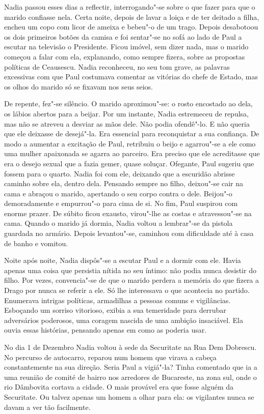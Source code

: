 Nadia passou esses dias a reflectir, interrogando"-se sobre o que fazer
para que o marido confiasse nela. Certa noite, depois de lavar a loiça e
de ter deitado a filha, encheu um copo com licor de ameixa e bebeu"-o de
um trago. Depois desabotoou os dois primeiros botões da camisa e foi
sentar"-se no sofá ao lado de Paul a escutar na
televisão o Presidente. Ficou imóvel, sem dizer nada, mas o marido
começou a falar com ela, explanando, como sempre fizera, sobre as
propostas políticas de Ceausescu. Nadia reconheceu, no seu tom grave, as
palavras excessivas com que Paul costumava comentar as vitórias do
chefe de Estado, mas os olhos do marido só se fixavam nos seus seios.

De repente, fez"-se silêncio. O marido aproximou"-se: o rosto encostado ao
dela, os lábios abertos para a beijar. Por um instante, Nadia estremeceu
de repulsa, mas não se atreveu a desviar as mãos dele. Não podia
ofendê"-lo. E não queria que ele deixasse de desejá"-la. Era essencial
para reconquistar a sua confiança. De modo a aumentar a excitação de
Paul, retribuiu o beijo e agarrou"-se a ele como uma mulher apaixonada se
agarra ao parceiro. Era preciso que ele acreditasse que era o desejo
sexual que a fazia gemer, quase soluçar. Ofegante, Paul sugeriu que
fossem para o quarto. Nadia foi com ele, deixando que a escuridão
abrisse caminho sobre ela, dentro dela. Pensando sempre no filho,
deixou"-se cair na cama e abraçou o marido, apertando o seu corpo contra
o dele. Beijou"-o demoradamente e empurrou"-o para cima de si. No fim,
Paul suspirou com enorme prazer. De súbito ficou exausto, virou"-lhe as
costas e atravessou"-se na cama. Quando o marido já dormia, Nadia voltou
a lembrar"-se da pistola guardada no armário. Depois levantou"-se,
caminhou com dificuldade até à casa de banho e vomitou.

Noite após noite, Nadia dispôs"-se a escutar Paul e a
dormir com ele. Havia apenas uma coisa que persistia nítida no seu
íntimo: não podia nunca desistir do filho. Por
vezes, convencia"-se de que o marido perdera a memória do que fizera a
Drago por nunca se referir a ele. Só lhe interessava o que acontecia
no partido. Enumerava intrigas políticas, armadilhas a pessoas comuns e
vigilâncias. Esboçando um sorriso vitorioso, exibia a sua temeridade
para derrubar adversários poderosos, uma coragem nascida de uma ambição
insaciável. Ela ouvia essas histórias, pensando apenas em como as
poderia usar.

\bigskip

No dia 1 de Dezembro Nadia voltou à sede da Securitate na Rua Dem
Dobrescu. No percurso de autocarro, reparou num homem que virava a
cabeça constantemente na sua direção. Seria Paul a vigiá"-la? Tinha
comentado que ia a uma reunião de comité de bairro nos arredores de
Bucareste, na zona sul, onde o rio Dâmbovita cortava a cidade. O mais
provável era que fosse alguém da Securitate. Ou talvez apenas um homem
a olhar para ela: os vigilantes nunca se davam a ver tão facilmente.

